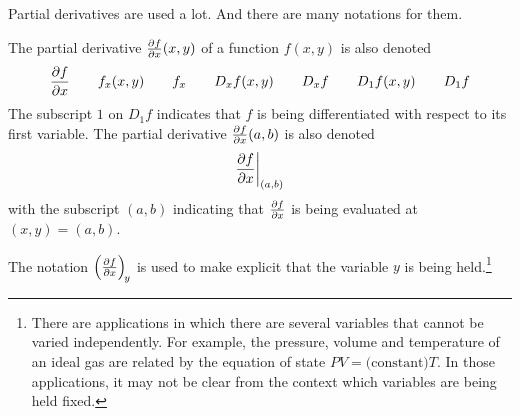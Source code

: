 Partial derivatives are used a lot. 
And there are many notations for them.
\begin{notn}\label{notn partial}
The partial derivative $\pdiff{f}{x}(x,y)$ of a function $f(x,y)$ is also denoted
\begin{equation*}
\pdiff{f}{x}\qquad
f_x(x,y)\qquad
f_x\qquad
D_xf(x,y)\qquad
D_xf\qquad
D_1 f(x,y)\qquad
D_1 f
\end{equation*}
The subscript $1$ on $D_1 f$ indicates that $f$ is being differentiated with respect to its first variable.
The partial derivative $\pdiff{f}{x}(a,b)$ is also denoted
\begin{equation*}
\pdiff{f}{x}\bigg|_{(a,b)}
\end{equation*}
with the subscript $(a,b)$ indicating that $\pdiff{f}{x}$ is being evaluated
at $(x,y)=(a,b)$.

\medskip
The notation ${\left(\pdiff{f}{x}\right)}_{\!y}$ is used to make explicit
that the variable $y$ is being held.\footnote{There are applications in which there are several variables that cannot be varied independently. For example,
the pressure, volume and temperature of an ideal gas are related by the equation of state $PV= \text{(constant)}T$. In those applications, it may not 
be clear from the context which variables are being held fixed.}


\end{notn}

